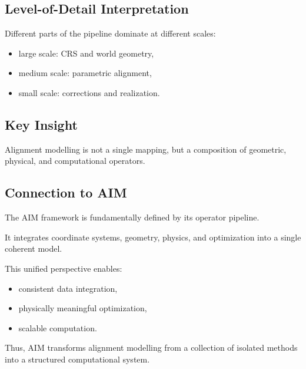 \subsection{Level-of-Detail Interpretation}

Different parts of the pipeline dominate at different scales:
\begin{itemize}
\item large scale: CRS and world geometry,
\item medium scale: parametric alignment,
\item small scale: corrections and realization.
\end{itemize}


\subsection{Key Insight}

\begin{proposition}
Alignment modelling is not a single mapping, but a composition of
geometric, physical, and computational operators.
\end{proposition}


\subsection{Connection to AIM}

\begin{summary}
The AIM framework is fundamentally defined by its operator pipeline.

It integrates coordinate systems, geometry, physics, and optimization
into a single coherent model.

This unified perspective enables:
\begin{itemize}
\item consistent data integration,
\item physically meaningful optimization,
\item scalable computation.
\end{itemize}

Thus, AIM transforms alignment modelling from a collection of isolated
methods into a structured computational system.
\end{summary}
